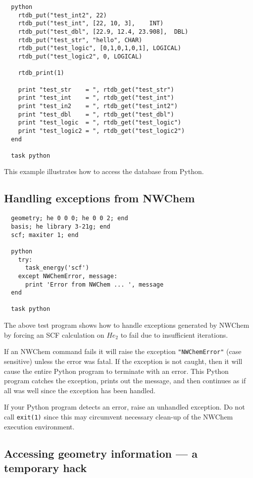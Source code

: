 \begin{verbatim}
  python
    rtdb_put("test_int2", 22)
    rtdb_put("test_int", [22, 10, 3],    INT)
    rtdb_put("test_dbl", [22.9, 12.4, 23.908],  DBL)
    rtdb_put("test_str", "hello", CHAR)
    rtdb_put("test_logic", [0,1,0,1,0,1], LOGICAL)
    rtdb_put("test_logic2", 0, LOGICAL)

    rtdb_print(1)

    print "test_str    = ", rtdb_get("test_str")
    print "test_int    = ", rtdb_get("test_int")
    print "test_in2    = ", rtdb_get("test_int2")
    print "test_dbl    = ", rtdb_get("test_dbl")
    print "test_logic  = ", rtdb_get("test_logic")
    print "test_logic2 = ", rtdb_get("test_logic2")
  end

  task python
\end{verbatim}

This example illustrates how to access the database from Python.

\subsection{Handling exceptions from NWChem}
\label{sec:pyerr}

\begin{verbatim}
  geometry; he 0 0 0; he 0 0 2; end
  basis; he library 3-21g; end
  scf; maxiter 1; end

  python
    try:
      task_energy('scf')
    except NWChemError, message:
      print 'Error from NWChem ... ', message
  end

  task python
\end{verbatim}

The above test program shows how to handle exceptions generated by
NWChem by forcing an SCF calculation on $He_2$ to fail due to
insufficient iterations.

If an NWChem command fails it will raise the exception
\verb+"NWChemError"+ (case sensitive) unless the error was fatal.
If the exception is not caught, then it will cause the entire Python
program to terminate with an error.  This Python program catches the
exception, prints out the message, and then continues as if all was
well since the exception has been handled.  

If your Python program detects an error, raise an unhandled
exception.  Do not call \verb+exit(1)+ since this may circumvent
necessary clean-up of the NWChem execution environment.

\subsection{Accessing geometry information --- a temporary hack}
\label{sec:pygeom}

